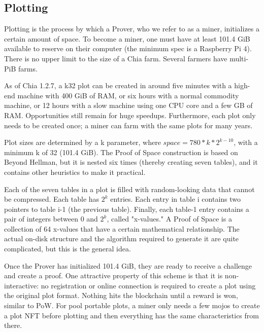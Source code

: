 \subsection{Plotting}
\begin{flushleft}
    Plotting is the process by which a Prover, who we refer to as a miner, initializes a certain amount of space. To become a miner, one must have at least 101.4 GiB available to reserve on their computer (the minimum spec is a Raspberry Pi 4). There is no upper limit to the size of a Chia farm. Several farmers have multi-PiB farms.
\end{flushleft}
\begin{flushleft}
    As of Chia 1.2.7, a k32 plot can be created in around five minutes with a high-end machine with 400 GiB of RAM, or six hours with a normal commodity machine, or 12 hours with a slow machine using one CPU core and a few GB of RAM. Opportunities still remain for huge speedups. Furthermore, each plot only needs to be created once; a miner can farm with the same plots for many years.
\end{flushleft}
\begin{flushleft}
    Plot sizes are determined by a k parameter, where $space = 780 * k * 2^{k - 10}$, with a minimum k of 32 (101.4 GiB). The Proof of Space construction is based on Beyond Hellman, but it is nested six times (thereby creating seven tables), and it contains other heuristics to make it practical.
\end{flushleft}
\begin{flushleft}
    Each of the seven tables in a plot is filled with random-looking data that cannot be compressed. Each table has $2^k$ entries. Each entry in table i contains two pointers to table i-1 (the previous table). Finally, each table-1 entry contains a pair of integers between 0 and $2^k$, called "x-values." A Proof of Space is a collection of 64 x-values that have a certain mathematical relationship. The actual on-disk structure and the algorithm required to generate it are quite complicated, but this is the general idea.
\end{flushleft}
\begin{flushleft}
    Once the Prover has initialized 101.4 GiB, they are ready to receive a challenge and create a proof. One attractive property of this scheme is that it is non-interactive: no registration or online connection is required to create a plot using the original plot format. Nothing hits the blockchain until a reward is won, similar to PoW. For pool portable plots, a miner only needs a few mojos to create a plot NFT before plotting and then everything has the same characteristics from there.
\end{flushleft}
